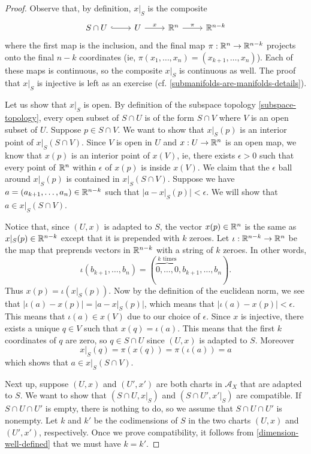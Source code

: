 \begin{proof}
	Observe that, by definition, $x|_S$ is the composite
	\[ \begin{tikzcd}
	S \cap U \ar[hookrightarrow]{r} & U \ar{r}{x} & \R^n \ar{r}{\pi} & \R^{n-k}
	\end{tikzcd} \]
	where the first map is the inclusion, and the final map $\pi : \mathbb{R}^n \to \mathbb{R}^{n-k}$ projects onto the final $n-k$ coordinates (ie, $\pi(x_1, \dotsc, x_n) = (x_{k+1}, \dotsc, x_n)$). Each of these maps is continuous, so the composite $x|_S$ is continuous as well. The proof that $x|_S$ is injective is left as an exercise (cf. \cref{submanifolds-are-manifolds-details}). 
	
	Let us show that $x|_S$ is open. By definition of the subspace topology \ref{subspace-topology}, every open subset of $S \cap U$ is of the form $S \cap V$ where $V$ is an open subset of $U$. Suppose $p \in  S \cap V$. We want to show that $x|_S(p)$ is an interior point of $x|_S(S \cap V)$. Since $V$ is open in $U$ and $x : U \to \mathbb{R}^n$ is an open map, we know that $x(p)$ is an interior point of $x(V)$, ie, there exists $\epsilon > 0$ such that every point of $\mathbb{R}^n$ within $\epsilon$ of $x(p)$ is inside $x(V)$. We claim that the $\epsilon$ ball around $x|_S(p)$ is contained in $x|_S(S \cap V)$. Suppose we have $a = (a_{k+1}, \dotsc, a_n) \in \mathbb{R}^{n-k}$ such that $|a - x|_S(p)| < \epsilon$. We will show that $a \in x|_S(S \cap V)$. 
	
	Notice that, since $(U,x)$ is adapted to $S$, the vector $x(p) \in \mathbb{R}^n$ is the same as $x|_S(p) \in \mathbb{R}^{n-k}$ except that it is prepended with $k$ zeroes. Let $\iota : \mathbb{R}^{n-k} \to \mathbb{R}^n$ be the map that preprends vectors in $\mathbb{R}^{n-k}$ with a string of $k$ zeroes. In other words, 
	\[ \iota(b_{k+1}, \dotsc, b_n) = (\overbrace{0, \dotsc, 0}^{k \text{ times}}, b_{k+1}, \dotsc, b_n). \]
	Thus $x(p) = \iota(x|_S(p))$. Now by the definition of the euclidean norm, we see that $|\iota(a) - x(p)| = |a - x|_S(p)|$, which means that $|\iota(a) - x(p)| < \epsilon$. This means that $\iota(a) \in x(V)$ due to our choice of $\epsilon$. Since $x$ is injective, there exists a unique $q \in V$ such that $x(q) = \iota(a)$. This means that the first $k$ coordinates of $q$ are zero, so $q \in S \cap U$ since $(U, x)$ is adapted to $S$. Moreover
	\[ x|_S(q) = \pi(x(q)) = \pi(\iota(a)) = a \]
	which shows that $a \in x|_S(S \cap V)$. 
	
	Next up, suppose $(U, x)$ and $(U', x')$ are both charts in $\mathscr{A}_X$ that are adapted to $S$. We want to show that $(S \cap U, x|_S)$ and $(S \cap U', x'|_S)$ are compatible. If $S \cap U \cap U'$ is empty, there is nothing to do, so we assume that $S \cap U \cap U'$ is nonempty. Let $k$ and $k'$ be the codimensions of $S$ in the two charts $(U, x)$ and $(U', x')$, respectively. Once we prove compatibility, it follows from \cref{dimension-well-defined} that we must have $k = k'$. 
	

\end{proof}
